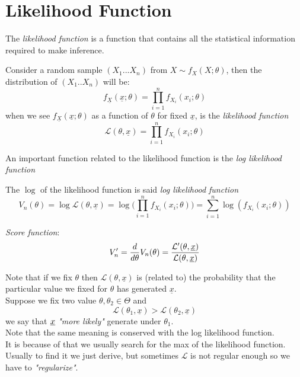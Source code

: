 \chapter{Likelihood Function}
\label{cha:likf}
\vspace{15pt}



The \textit{likelihood function} is a function that contains all the statistical information required to make inference.\\
\begin{defi}
	Consider a random sample  $(X_1...X_n)$ from $ X \sim f_X(X; \theta)$, then the distribution of $(X_1..X_n)$ will be:
	$$f_{\underline X}(\underline x;\theta)=\prod_{i=1}^{n}f_{X_i}(x_i;\theta)$$
	when we see $f_{\underline X}(\underline x;\theta)$ as a function of $\theta$ for fixed $\underline x$, is the \textit{likelihood function}
	$$\mathcal{L}(\theta,\underline x)=\prod_{i=1}^{n}f_{X_i}(x_i;\theta)$$
\end{defi}
	An important function related to the likelihood function is the \textit{log likelihood function} 
\begin{defi}
	The $\log$ of the likelihood function is said \textit{log likelihood function}
	$$V_n(\theta)=\log\mathcal{L}(\theta,\underline x)=\log \bigg( \prod_{i=1}^{n}f_{X_i}(x_i;\theta) \bigg)=\sum_{i=1}^{n}\log( f_{X_i}(x_i;\theta))$$
\end{defi}
\begin{defi}\label{defi:scoref}
	\textit{Score function}:
	$$V'_n=\frac{d}{d \theta}V_n(\theta)=\frac{\mathcal{L}'(\theta, \underline x)}{\mathcal{L}(\theta, \underline x)}$$
\end{defi}
Note that if we fix $\theta$ then $\mathcal{L}(\theta,\underline x)$ is (related to) the probability that the particular value we fixed for $\theta$ has generated $\underline x$.\\
Suppose we fix two value $\theta,\theta_2\in \Theta$ and 
$$\mathcal{L}(\theta_1,\underline x)>\mathcal{L}(\theta_2,\underline x)$$
we say that $\underline x$ \textit{"more likely"} generate under $\theta_1$.\\
Note that the same meaning is conserved with the log likelihood function.\\
It is because of that we usually search for the max of the likelihood function. Usually to find it we just derive, but sometimes $\mathcal{L}$ is not regular enough so we have to \textit{"regularize"}.
